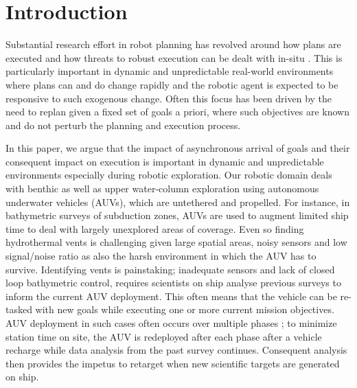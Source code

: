 \section{Introduction}
\label{sec:intro}

Substantial research effort in robot planning has revolved around how
plans are executed and how threats to robust execution can be dealt
with in-situ . This is particularly
important in dynamic and unpredictable real-world environments where
plans can and do change rapidly and the robotic agent is expected to
be responsive to such exogenous change. Often this focus has been
driven by the need to replan given a fixed set of goals a priori,
where such objectives are known and do not perturb the planning and
execution process.

In this paper, we argue that the impact of asynchronous arrival of
goals and their consequent impact on execution is important 
in dynamic and unpredictable environments especially during robotic
exploration. Our robotic domain deals with benthic as well as upper
water-column exploration using autonomous underwater vehicles (AUVs),
which are untethered and propelled. For instance, in bathymetric
surveys of subduction zones, AUVs are used to augment limited ship
time to deal with largely unexplored areas of coverage. Even so
finding hydrothermal vents is challenging given large spatial areas,
noisy sensors and low signal/noise ratio as also the harsh environment
in which the AUV has to survive. Identifying vents is painstaking;
inadequate sensors and lack of closed loop bathymetric control,
requires scientists on ship analyse previous surveys to inform the
current AUV deployment. This often means that the vehicle can be
re-tasked with new goals while executing one or more current mission
objectives.  AUV deployment in such cases often occurs over multiple
phases \cite{Yoerger01012007}; to minimize station time on site, the
AUV is redeployed after each phase after a vehicle recharge while data
analysis from the past survey continues. Consequent analysis then
provides the impetus to retarget when new scientific targets are
generated on ship.

